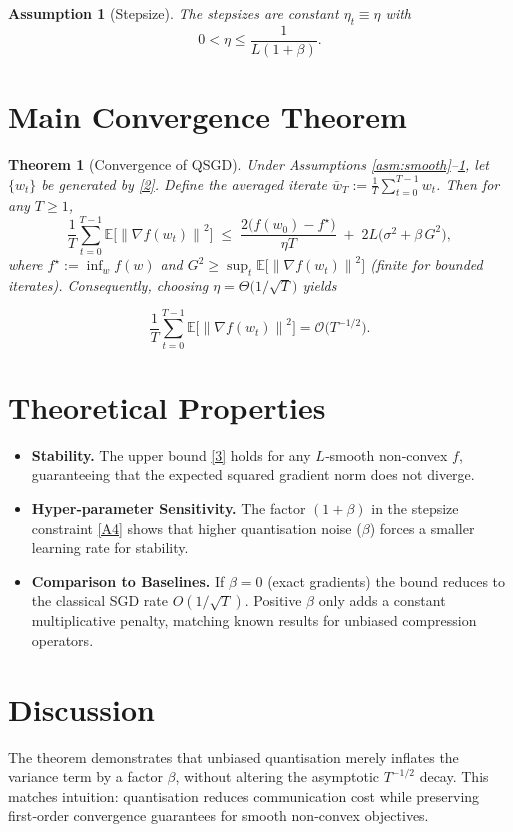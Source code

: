 \documentclass[11pt]{article}
\newtheorem{theorem}{Theorem}
\newtheorem{assumption}{Assumption}
\newcommand{\EE}{\mathbb{E}}
\newcommand{\norm}[1]{\left\lVert#1\right\rVert}
\begin{document}
\begin{assumption}[Stepsize]\label{asm:stepsize}
The stepsizes are constant $\eta_t\equiv\eta$ with 
\[
0<\eta\le\frac{1}{L(1+\beta)} .
\tag{A4}
\]
\end{assumption}

\section*{Main Convergence Theorem}
\begin{theorem}[Convergence of QSGD]\label{thm:main}
Under Assumptions \ref{asm:smooth}–\ref{asm:stepsize}, let $\{w_t\}$ be generated by \eqref{2}.  
Define the averaged iterate $\bar w_T:=\frac{1}{T}\sum_{t=0}^{T-1} w_t$.  
Then for any $T\ge 1$,
\[
\frac{1}{T}\sum_{t=0}^{T-1}\EE\!\big[\norm{\nabla f(w_t)}^2\big]
\;\le\;
\frac{2\big(f(w_0)-f^\star\big)}{\eta T}
\;+\;
2L\big(\sigma^2+\beta\,G^2\big),
\tag{3}
\]
where $f^\star:=\inf_w f(w)$ and $G^2\ge \sup_{t}\EE\!\big[\norm{\nabla f(w_t)}^2\big]$ (finite for bounded iterates).  
Consequently, choosing $\eta = \Theta\!\big(1/\sqrt{T}\big)$ yields  

\[
\frac{1}{T}\sum_{t=0}^{T-1}\EE\!\big[\norm{\nabla f(w_t)}^2\big]=
\mathcal{O}\!\big(T^{-1/2}\big) .
\]
\end{theorem}

\section*{Theoretical Properties}
\begin{itemize}
\item \textbf{Stability.} The upper bound \eqref{3} holds for any $L$‑smooth non‑convex $f$, guaranteeing that the expected squared gradient norm does not diverge.
\item \textbf{Hyper‑parameter Sensitivity.} The factor $(1+\beta)$ in the stepsize constraint \eqref{A4} shows that higher quantisation noise ($\beta$) forces a smaller learning rate for stability.
\item \textbf{Comparison to Baselines.} If $\beta=0$ (exact gradients) the bound reduces to the classical SGD rate $O(1/\sqrt{T})$.  Positive $\beta$ only adds a constant multiplicative penalty, matching known results for unbiased compression operators.
\end{itemize}

\section*{Discussion}
The theorem demonstrates that unbiased quantisation merely inflates the variance term by a factor $\beta$, without altering the asymptotic $T^{-1/2}$ decay.  This matches intuition: quantisation reduces communication cost while preserving first‑order convergence guarantees for smooth non‑convex objectives.
\end{document}
